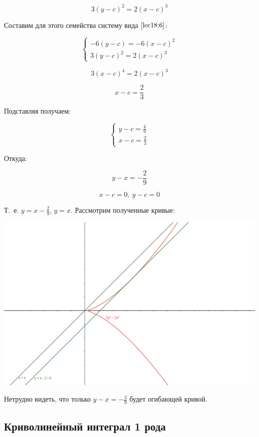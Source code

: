 \documentclass[../../main.tex]{subfiles}
\begin{document}
 \begin{exmp}
\[ 3\left( y - c\right)^2 = 2 \left( x-c \right)^3  \]

Составим для этого семейства систему вида $\eqref{lec18:6}$:

\[ \begin{cases}
-6\left( y - c\right)  = -6 \left( x - c\right)^2\\
3\left( y - c\right)^2 = 2 \left( x - c \right)^3
\end{cases}  \]

\[ 3\left( x-c\right)^4  = 2 \left( x-c\right)^3 \]

\[ x-c = \frac{2}{3} \]

Подставляя получаем:

\[ \begin{cases}
y-c  = \frac{4}{9}\\
x-c = \frac{2}{3}
\end{cases}  \]

Откуда:

\[ y - x = -\frac{2}{9} \]

\[ x-c = 0,\ y - c = 0 \]

Т.~е. $y  = x - \frac{2}{9}$, $y=x$. Рассмотрим полученные кривые:

\begin{center} \includegraphics[scale=0.8]{hiperbola.png} \end{center}


Нетрудно видеть, что только $y - x = -\frac{2}{9}$ будет огибающей кривой.

\end{exmp}


\subsection{Криволинейный интеграл 1 рода}
\end{document}
